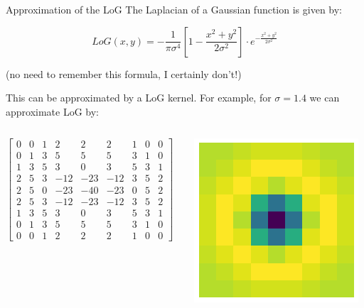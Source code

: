 \documentclass[9pt, aspectratio=169]{beamer}
\begin{document}
\begin{frame}
    {Approximation of the LoG}
    The Laplacian of a Gaussian function is given by:

    \Large
    $$LoG(x,y) = -\frac{1}{\pi \sigma^4}[1-\frac{x^2+y^2}{2\sigma^2}]\cdot e^{-\frac{x^2+y^2}{2\sigma^2}}$$

    \normalsize
    \centering
    (no need to remember this formula, I certainly don't!)

    This can be approximated by a LoG kernel. For example, for $\sigma = 1.4$ we can approximate LoG by:

    \begin{columns}
        \begin{column}{.7\textwidth}
            \small
            $\begin{bmatrix}0 & 0 & 1 & 2   & 2   & 2   & 1 & 0 & 0 \\
                    0 & 1 & 3 & 5   & 5   & 5   & 3 & 1 & 0 \\
                    1 & 3 & 5 & 3   & 0   & 3   & 5 & 3 & 1 \\
                    2 & 5 & 3 & -12 & -23 & -12 & 3 & 5 & 2 \\
                    2 & 5 & 0 & -23 & -40 & -23 & 0 & 5 & 2 \\
                    2 & 5 & 3 & -12 & -23 & -12 & 3 & 5 & 2 \\
                    1 & 3 & 5 & 3   & 0   & 3   & 5 & 3 & 1 \\
                    0 & 1 & 3 & 5   & 5   & 5   & 3 & 1 & 0 \\
                    0 & 0 & 1 & 2   & 2   & 2   & 1 & 0 & 0\end{bmatrix}$
        \end{column}
        \begin{column}{.3\textwidth}
            \includegraphics[width=.6\textwidth]{LoG kernel.png}
        \end{column}
    \end{columns}

\end{frame}
\end{document}
